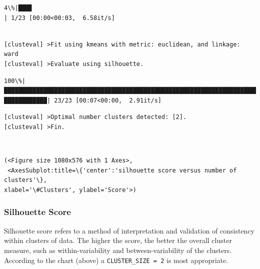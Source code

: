 \documentclass[11pt]{article}
\makeatletter
\newcommand{\boxspacing}{\kern\kvtcb@left@rule\kern\kvtcb@boxsep}
\newcommand{\prompt}[4]{
        {\ttfamily\llap{{\color{#2}[#3]:\hspace{3pt}#4}}\vspace{-\baselineskip}}
    }
\makeatother
\begin{document}
    \begin{Verbatim}[commandchars=\\\{\}]
  4\%|███▊
| 1/23 [00:00<00:03,  6.58it/s]
    \end{Verbatim}

    \begin{Verbatim}[commandchars=\\\{\}]

[clusteval] >Fit using kmeans with metric: euclidean, and linkage: ward
[clusteval] >Evaluate using silhouette.
    \end{Verbatim}

    \begin{Verbatim}[commandchars=\\\{\}]
100\%|███████████████████████████████████████████████████████████████████████████
████████████| 23/23 [00:07<00:00,  2.91it/s]
    \end{Verbatim}

    \begin{Verbatim}[commandchars=\\\{\}]
[clusteval] >Optimal number clusters detected: [2].
[clusteval] >Fin.
    \end{Verbatim}

    \begin{center}
    \end{center}
    { \hspace*{\fill} \\}
    
            \begin{tcolorbox}[breakable, size=fbox, boxrule=.5pt, pad at break*=1mm, opacityfill=0]
\prompt{Out}{outcolor}{59}{\boxspacing}
\begin{Verbatim}[commandchars=\\\{\}]
(<Figure size 1080x576 with 1 Axes>,
 <AxesSubplot:title=\{'center':'silhouette score versus number of clusters'\},
xlabel='\#Clusters', ylabel='Score'>)
\end{Verbatim}
\end{tcolorbox}
        
    \hypertarget{silhouette-score}{%
\subsubsection{Silhouette Score}\label{silhouette-score}}

Silhouette score refers to a method of interpretation and validation of
consistency within clusters of data. The higher the score, the better
the overall cluster measure, such as within-variability and
between-variability of the clusters. According to the chart (above) a
\texttt{CLUSTER\_SIZE\ =\ 2} is most appropriate.
\end{document}
